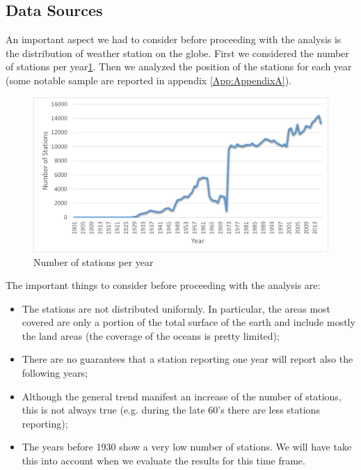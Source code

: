 \documentclass{vldb}
\begin{document}
\subsection{Data Sources}
An important aspect we had to consider before proceeding with the analysis is the distribution of weather station on the globe. First we considered the number of stations per year\ref{fig:stations}. Then we analyzed the position of the stations for each year (some notable sample are reported in appendix \ref{App:AppendixA}). 

\begin{figure}[tbh]
\includegraphics[width=1\linewidth]{stations}
\caption{Number of stations per year}
\label{fig:stations}
\end{figure}

The important things to consider before proceeding with the analysis are:
\begin{itemize}
    \item The stations are not distributed uniformly. In particular, the areas most covered are only a portion of the total surface of the earth and include mostly the land areas (the coverage of the oceans is pretty limited);
    \item There are no guarantees that a station reporting one year will report also the following years;
    \item Although the general trend manifest an increase of the number of stations, this is not always true (e.g. during the late 60's there are less stations reporting);
    \item The years before 1930 show a very low number of stations. We will have take this into account when we evaluate the results for this time frame.
\end{itemize}
\end{document}
